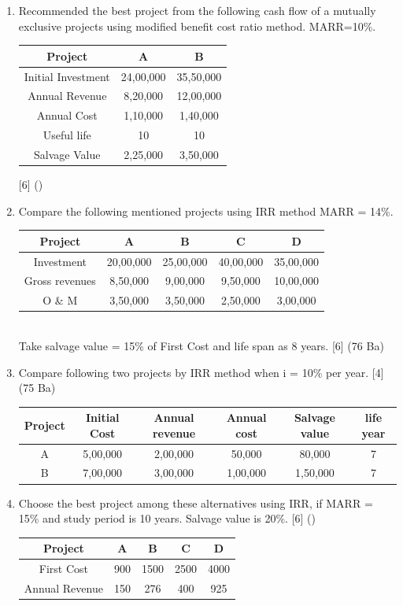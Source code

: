 \documentclass[12pt]{article}
\begin{document}
\begin{enumerate}
			\item Recommended the best project from the following cash flow of a mutually exclusive projects using modified benefit cost ratio method. MARR=10\%. \\ 
			\begin{tabular}{|c|c|c|}
			\hline
			Project & A & B \\ \hline
			Initial Investment & 24,00,000 & 35,50,000 \\ \hline
			Annual Revenue & 8,20,000 & 12,00,000 \\ \hline
			Annual Cost & 1,10,000 & 1,40,000 \\ \hline
			Useful life & 10 & 10 \\ \hline
			Salvage Value & 2,25,000 & 3,50,000 \\ \hline
			\end{tabular} \hfill [6] ()
			
			\item Compare the following mentioned projects using IRR method MARR = 14\%. \\
			\begin{tabular}{|c|c|c|c|c|}
				\hline
				Project & A & B & C & D\\ \hline
				Investment & 20,00,000 & 25,00,000 & 40,00,000 & 35,00,000\\ \hline
				Gross revenues & 8,50,000 & 9,00,000 & 9,50,000 & 10,00,000\\ \hline
				O \& M & 3,50,000 & 3,50,000 & 2,50,000 & 3,00,000 \\ \hline
			\end{tabular}\\
			Take salvage value = 15\% of First Cost and life span as 8 years. \hfill [6] (76 Ba)
			
			\item Compare following two projects by IRR method when i = 10\% per year. \hfill [4] (75 Ba)\\
			\begin{tabular}{|c|c|c|c|c|c|}
				\hline
				Project & Initial Cost & Annual revenue & Annual cost & Salvage value & life year\\ \hline
				A & 5,00,000 & 2,00,000 & 50,000 & 80,000 & 7 \\ \hline
				B & 7,00,000 & 3,00,000 & 1,00,000 & 1,50,000 & 7 \\ \hline
			\end{tabular}
			
			\item Choose the best project among these alternatives using IRR, if MARR = 15\% and study period is 10 years. Salvage value is 20\%. \hfill [6] ()\\
			\begin{tabular}{|c|c|c|c|c|}
				\hline
				Project & A & B & C & D \\ \hline
				First Cost & 900 & 1500 & 2500 & 4000 \\ \hline
				Annual Revenue & 150 & 276 & 400 & 925 \\ \hline
			\end{tabular}
			

\end{enumerate}
\end{document}
